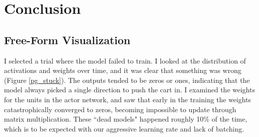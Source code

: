 \documentclass[12pt,a4paper]{article}
\begin{document}
\section{Conclusion}
%
\subsection*{Free-Form Visualization}
%



I selected a trial where the model failed to train. I looked at the distribution of activations and weights over time, and it was clear that something was wrong (Figure \ref{pg_stuck}). The outputs tended to be zeros or ones, indicating that the model always picked a single direction to push the cart in. I examined the weights for the units in the actor network, and saw that early in the training the weights catastrophically converged to zeros, becoming impossible to update through matrix multiplication. These ``dead models" happened roughly 10\% of the time, which is to be expected with our aggressive learning rate and lack of batching.
 
\end{document}
